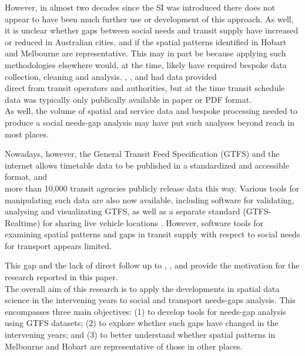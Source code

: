 \documentclass[preprint, 3p,
authoryear]{elsarticle} %
\begin{document}
However, in almost two decades since the SI was introduced there does
not appear to have been much further use or development of this
approach. As well, it is unclear whether gaps between social needs and
transit supply have increased or reduced in Australian cities, and if
the spatial patterns identified in Hobart
\citep{Currie2003Hobart, Currie2004Gap} and Melbourne
\citep{Currie2007Identifying, currie2010identifying} are representative.
This may in part be because applying such methodologies elsewhere would,
at the time, likely have required bespoke data collection, cleaning and
analysis. \citet{Currie2003Hobart}, \citet{Currie2004Gap},
\citet{Currie2007Identifying} and \citet{currie2010identifying} had data
provided\\
direct from transit operators and authorities, but at the time transit
schedule data was typically only publically available in paper or PDF
format.\\
As well, the volume of spatial and service data and bespoke processing
needed to produce a social needs-gap analysis may have put such analyses
beyond reach in most places.

Nowadays, however, the General Transit Feed Specification (GTFS) and the
internet allows timetable data to be published in a standardized and
accessible format, and\\
more than 10,000 transit agencies publicly release data this way.
Various tools for manipulating such data are also now available,
including software for validating, analysing and visualizating GTFS, as
well as a separate standard (GTFS-Realtime) for sharing live vehicle
locations \citep{GTFS}. However, software tools for examining spatial
patterns and gaps in transit supply with respect to social needs for
transport appears limited.

This gap and the lack of direct follow up to \citet{Currie2003Hobart},
\citet{Currie2004Gap}, \citet{Currie2007Identifying} and
\citet{currie2010identifying} provide the motivation for the research
reported in this paper.\\
The overall aim of this research is to apply the developments in spatial
data science in the intervening years to social and transport needs-gaps
analysis. This encompasses three main objectives: (1) to develop tools
for needs-gap analysis using GTFS datasets; (2) to explore whether such
gaps have changed in the intervening years; and (3) to better understand
whether spatial patterns in Melbourne and Hobart are representative of
those in other places.
\end{document}
